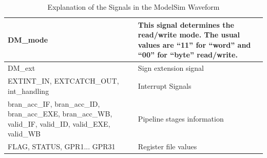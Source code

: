 \begin{table}[!htb]
\begin{tabular}{|p{4cm}|p{13cm}|}
		DM\_mode & This signal determines the read/write mode. The usual values
		are ``11'' for ``word'' and ``00'' for ``byte''
		read/write.\\\hline
		DM\_ext & Sign extension signal\\\hline
		EXTINT\_IN, 
		EXTCATCH\_OUT, 
		int\_handling & 
		Interrupt Signals \\\hline
		bran\_acc\_IF,
		bran\_acc\_ID,
		bran\_acc\_EXE,
		bran\_acc\_WB,
		valid\_IF,
		valid\_ID,
		valid\_EXE,
		valid\_WB & 
		Pipeline stages information \\\hline
		FLAG,
		STATUS, 
		GPR1... GPR31 & 
		Register file values \\\hline
	\end{tabular}
	\caption{Explanation of the Signals in the ModelSim Waveform}
	\label{fig:fig57}
\end{table}

